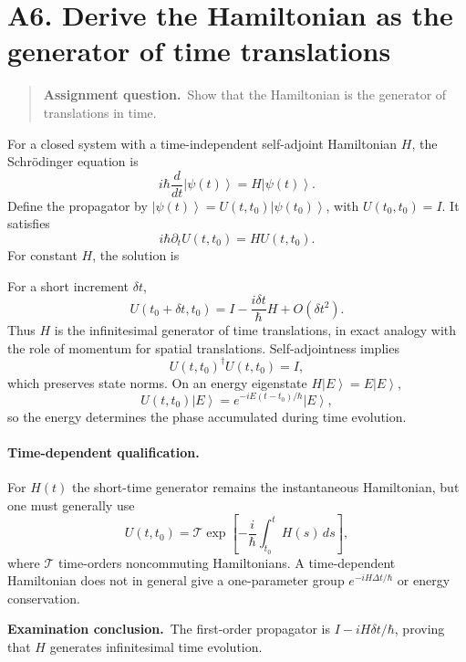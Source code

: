 \documentclass[11pt,a4paper]{article}
\theoremstyle{definition}
\newcommand{\ket}[1]{\left|#1\right\rangle}
\newcommand{\result}[1]{\begin{center}\fcolorbox{light}{white}{\begin{minipage}{0.88\textwidth}\centering\vspace{2pt}\(\displaystyle #1\)\vspace{2pt}\end{minipage}}\end{center}}
\newenvironment{question}{\begin{quote}\small\noindent\textbf{Assignment question.}\ }{\end{quote}}
\newcommand{\exam}[1]{\par\medskip\noindent\textbf{Examination conclusion.}\ #1\par}
\begin{document}
\section{A6. Derive the Hamiltonian as the generator of time translations}
\begin{question}Show that the Hamiltonian is the generator of translations in time.\end{question}
For a closed system with a time-independent self-adjoint Hamiltonian $H$, the Schr\"odinger equation is
\begin{equation}
i\hbar\frac{d}{dt}\ket{\psi(t)}=H\ket{\psi(t)}.
\end{equation}
Define the propagator by $\ket{\psi(t)}=U(t,t_0)\ket{\psi(t_0)}$, with $U(t_0,t_0)=I$. It satisfies
\begin{equation}
i\hbar\partial_t U(t,t_0)=H U(t,t_0).
\end{equation}
For constant $H$, the solution is
\result{U(t,t_0)=e^{-iH(t-t_0)/\hbar}.}
For a short increment $\delta t$,
\begin{equation}
U(t_0+\delta t,t_0)=I-\frac{i\delta t}{\hbar}H+O(\delta t^2).
\end{equation}
Thus $H$ is the infinitesimal generator of time translations, in exact analogy with the role of momentum for spatial translations. Self-adjointness implies
\begin{equation}
U(t,t_0)^\dagger U(t,t_0)=I,
\end{equation}
which preserves state norms. On an energy eigenstate $H\ket E=E\ket E$,
\begin{equation}
U(t,t_0)\ket E=e^{-iE(t-t_0)/\hbar}\ket E,
\end{equation}
so the energy determines the phase accumulated during time evolution.
\paragraph{Time-dependent qualification.} For $H(t)$ the short-time generator remains the instantaneous Hamiltonian, but one must generally use
\begin{equation}
U(t,t_0)=\mathcal T\exp\!\left[-\frac{i}{\hbar}\int_{t_0}^t H(s)\,ds\right],
\end{equation}
where $\mathcal T$ time-orders noncommuting Hamiltonians. A time-dependent Hamiltonian does not in general give a one-parameter group $e^{-iH\Delta t/\hbar}$ or energy conservation.
\exam{The first-order propagator is $I-iH\delta t/\hbar$, proving that $H$ generates infinitesimal time evolution.}
\end{document}
